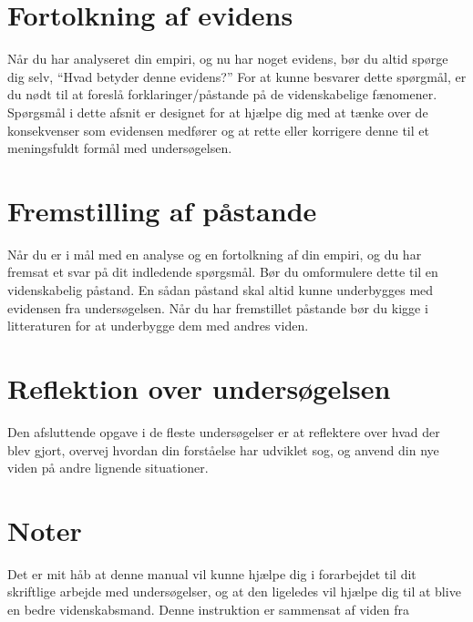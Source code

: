  \section{Fortolkning af evidens}
\label{sec:FaE}
Når du har analyseret din empiri, og nu har noget evidens, bør du altid spørge dig selv, ``Hvad betyder denne evidens?'' For at kunne besvarer dette spørgmål, er du nødt til at foreslå forklaringer/påstande på de videnskabelige fænomener. Spørgsmål i dette afsnit er designet for at hjælpe dig med at tænke over de konsekvenser som evidensen medfører og at rette eller korrigere denne til et meningsfuldt formål med undersøgelsen.

\section{Fremstilling af påstande}
\label{sec:FaP}
Når du er i mål med en analyse og en fortolkning af din empiri, og du har fremsat et svar på dit indledende spørgsmål. Bør du omformulere dette til en videnskabelig påstand. En sådan påstand skal altid kunne underbygges med evidensen fra undersøgelsen. Når du har fremstillet påstande bør du kigge i litteraturen for at underbygge dem med andres viden.

\section{Reflektion over undersøgelsen}
\label{sec:RoU}
Den afsluttende opgave i de fleste undersøgelser er at reflektere over hvad der blev gjort, overvej hvordan din forståelse har udviklet sog, og anvend din nye viden på andre lignende situationer.

\section{Noter}
Det er mit håb at denne manual vil kunne hjælpe dig i forarbejdet til dit skriftlige arbejde med undersøgelser, og at den ligeledes vil hjælpe dig til at blive en bedre videnskabsmand. Denne instruktion er sammensat af viden fra \citep{Hand2004, Greenbowe2005, Krogh2016}